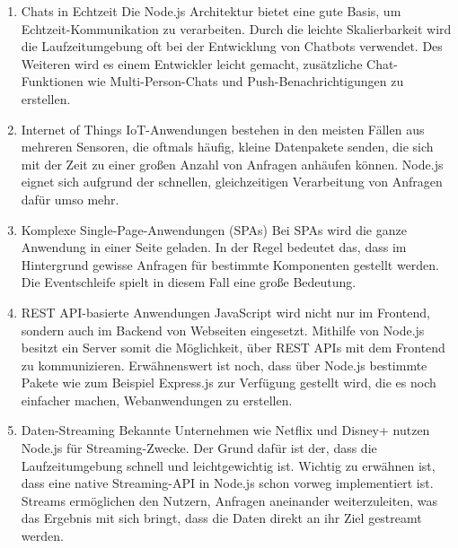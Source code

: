 \begin{enumerate}
    \item Chats in Echtzeit
    \newline Die Node.js Architektur bietet eine gute Basis, um Echtzeit-Kommunikation zu verarbeiten. Durch die leichte Skalierbarkeit wird die Laufzeitumgebung oft bei der Entwicklung von Chatbots verwendet. Des Weiteren wird es einem Entwickler leicht gemacht, zusätzliche Chat-Funktionen wie Multi-Person-Chats und Push-Benachrichtigungen zu erstellen.
    \item Internet of Things
    \newline
    IoT-Anwendungen bestehen in den meisten Fällen aus mehreren Sensoren, die oftmals häufig, kleine Datenpakete senden, die sich mit der Zeit zu einer großen Anzahl von Anfragen anhäufen können. Node.js eignet sich aufgrund der schnellen, gleichzeitigen Verarbeitung von Anfragen dafür umso mehr.
    \item Komplexe Single-Page-Anwendungen (SPAs)
    \newline
    Bei SPAs wird die ganze Anwendung in einer Seite geladen. In der Regel bedeutet das, dass im Hintergrund gewisse Anfragen für bestimmte Komponenten gestellt werden. Die Eventschleife spielt in diesem Fall eine große Bedeutung.
    \item REST API-basierte Anwendungen
    \newline
    JavaScript wird nicht nur im Frontend, sondern auch im Backend von Webseiten eingesetzt. Mithilfe von Node.js besitzt ein Server somit die Möglichkeit, über REST APIs mit dem Frontend zu kommunizieren. Erwähnenswert ist noch, dass über Node.js bestimmte Pakete wie zum Beispiel Express.js zur Verfügung gestellt wird, die es noch einfacher machen, Webanwendungen zu erstellen.
    \item Daten-Streaming
    \newline
    Bekannte Unternehmen wie Netflix und Disney+ nutzen Node.js für Streaming-Zwecke. Der Grund dafür ist der, dass die Laufzeitumgebung schnell und leichtgewichtig ist. Wichtig zu erwähnen ist, dass eine native Streaming-API in Node.js schon vorweg implementiert ist. Streams ermöglichen den Nutzern, Anfragen aneinander weiterzuleiten, was das Ergebnis mit sich bringt, dass die Daten direkt an ihr Ziel gestreamt werden.
    
\end{enumerate}
\cite{Anwendungen}




